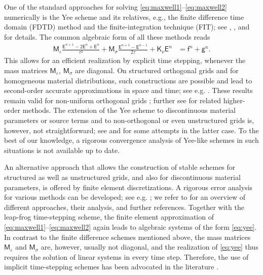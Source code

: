 \documentclass[12pt,reqno,a4paper]{amsart}
\theoremstyle{definition}
\def\ttE{\mathsf{E}}
\def\ttK{\mathsf{K}}
\def\ttK{\mathsf{K}}
\def\ttM{\mathsf{M}}
\def\ttf{\mathsf{f}}
\def\ttg{\mathsf{g}}
\def\eps{\varepsilon}
\begin{document}
One of the standard approaches for solving \eqref{eq:maxwell1}--\eqref{eq:maxwell2} numerically is the Yee scheme and its relatives, e.g., the finite difference time domain (FDTD) method and the finite-integration technique (FIT); see \cite{Yee66}, \cite{Taflove80,Taflove05}, and \cite{Weiland77,Weiland03} for details.
The common algebraic form of all these methods reads 
\begin{align} \label{eq:yee}
\ttM_\eps \frac{\ttE^{n+1} - 2 \ttE^n + \ttE^n}{\tau^2} + \ttM_\sigma \frac{\ttE^{n+1} - \ttE^{n-1}}{2\tau} + \ttK_\nu \ttE^n &= \ttf^n + \ttg^n.
\end{align}
This allows for an efficient realization by explicit time stepping, whenever the mass matrices $\ttM_\eps$, $\ttM_\sigma$ are diagonal. On structured orthogonal grids and for homogeneous material distributions, such constructions are possible and lead to second-order accurate approximations in space and time; see e.g. \cite{Cohen02,Taflove05,Yee66}. These results remain valid for non-uniform orthogonal grids \cite{MonkSuli94}; further see \cite{Cohen02,CohenMonk95} for related higher-order methods.
The extension of the Yee scheme to discontinuous material parameters or source terms and to non-orthogonal or even unstructured grids is, however, not straightforward; see \cite{Holland83,Lee92,SchuhmannWeiland98,SchuhmannWeiland98b} and \cite{BossavitKettunen99,CodecasaKapidaniSpecognaTrevisan18,CodecasaPoliti08} for some attempts in the latter case. To the best of our knowledge, a rigorous convergence analysis of Yee-like schemes in such situations is not available up to date. 


An alternative approach that allows the construction of stable schemes for structured as well as unstructured grids, and also for discontinuous material parameters, is offered by finite element discretizations. A rigorous error analysis for various methods can be developed; see e.g. \cite{Monk92a,Monk92c,Monk93}; we refer to \cite{Cohen02,Joly03} for an overview of different approaches, their analysis, and further references. 
Together with the leap-frog time-stepping scheme, the finite element approximation of \eqref{eq:maxwell1}--\eqref{eq:maxwell2} again leads to algebraic systems of the form \eqref{eq:yee}. 
In contrast to the finite difference schemes mentioned above, the mass matrices $\ttM_\eps$ and $\ttM_\sigma$ are, however, usually not diagonal, and the realization of \eqref{eq:yee} thus requires the solution of linear systems in every time step. Therefore, the use of implicit time-stepping schemes has been advocated in the literature \cite{MakridakisMonk95,Monk93a}. 
\end{document}
